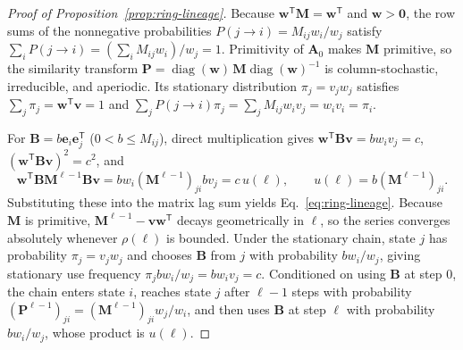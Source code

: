 \begin{proof}[Proof of Proposition~{\upshape\ref{prop:ring-lineage}}]
Because $\mathbf{w}^{\mathsf{T}}\mathbf{M} = \mathbf{w}^{\mathsf{T}}$ and $\mathbf{w} > \mathbf{0}$, the row sums of the nonnegative probabilities $P(j \to i) = M_{ij} w_i / w_j$ satisfy $\sum_i P(j \to i) = (\sum_i M_{ij} w_i)/w_j = 1$. Primitivity of $\mathbf{A}_0$ makes $\mathbf{M}$ primitive, so the similarity transform $\mathbf{P} = \operatorname{diag}(\mathbf{w})\,\mathbf{M}\operatorname{diag}(\mathbf{w})^{-1}$ is column-stochastic, irreducible, and aperiodic. Its stationary distribution $\pi_j = v_j w_j$ satisfies $\sum_j \pi_j = \mathbf{w}^{\mathsf{T}}\mathbf{v} = 1$ and $\sum_j P(j \to i)\pi_j = \sum_j M_{ij} w_i v_j = w_i v_i = \pi_i$.

For $\mathbf{B} = b\mathbf{e}_i\mathbf{e}_j^{\mathsf{T}}$ ($0 < b \le M_{ij}$), direct multiplication gives $\mathbf{w}^{\mathsf{T}}\mathbf{B}\mathbf{v} = b w_i v_j = c$, $(\mathbf{w}^{\mathsf{T}}\mathbf{B}\mathbf{v})^2 = c^2$, and
\[
\mathbf{w}^{\mathsf{T}}\mathbf{B}\mathbf{M}^{\ell-1}\mathbf{B}\mathbf{v} = b w_i (\mathbf{M}^{\ell-1})_{ji} b v_j = c\,u(\ell), \qquad u(\ell) = b(\mathbf{M}^{\ell-1})_{ji}.
\]
Substituting these into the matrix lag sum yields Eq.~\eqref{eq:ring-lineage}. Because $\mathbf{M}$ is primitive, $\mathbf{M}^{\ell-1} - \mathbf{v}\mathbf{w}^{\mathsf{T}}$ decays geometrically in $\ell$, so the series converges absolutely whenever $\rho(\ell)$ is bounded. Under the stationary chain, state $j$ has probability $\pi_j = v_j w_j$ and chooses $\mathbf{B}$ from $j$ with probability $b w_i / w_j$, giving stationary use frequency $\pi_j b w_i / w_j = b w_i v_j = c$. Conditioned on using $\mathbf{B}$ at step $0$, the chain enters state $i$, reaches state $j$ after $\ell - 1$ steps with probability $(\mathbf{P}^{\ell-1})_{ji} = (\mathbf{M}^{\ell-1})_{ji} w_j / w_i$, and then uses $\mathbf{B}$ at step $\ell$ with probability $b w_i / w_j$, whose product is $u(\ell)$.


\end{proof}
